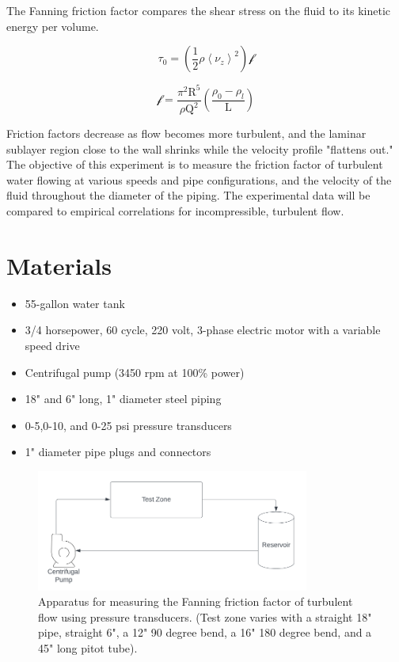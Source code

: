 \documentclass{article}
\begin{document}
\noindent \item \raggedright
The Fanning friction factor compares the shear stress on the fluid to its kinetic energy per volume.

\begin{equation} \label{eq:3} 
\tau_{0} =\left(\frac{1}{2} \rho\left< \nu_{z}\right>^2 \right)\mathcal{f} 
\end{equation}

\linebreak
\linebreak

\begin{equation} \label{eq:4} 
\mathcal{f} = \frac{\pi^2\mathrm{R}^5}{\rho\mathrm{Q}^2} \left( \frac{ \rho_{0} - \rho_{l}}{\mathrm{L}} \right)
\end{equation}

Friction factors decrease as flow becomes more turbulent, and the laminar sublayer region close to the wall shrinks while the velocity profile "flattens out." The objective of this experiment is to measure the friction factor of turbulent water flowing at various speeds and pipe configurations, and the velocity of the fluid throughout the diameter of the piping. The experimental data will be compared to empirical correlations for incompressible, turbulent flow.

\section*{Materials}
\begin{itemize}
    \item 55-gallon water tank
    \item 3/4 horsepower, 60 cycle, 220 volt, 3-phase electric motor with a variable speed drive
    \item Centrifugal pump (3450 rpm at 100\% power)
    \item 18" and 6" long, 1" diameter steel piping
    \item 0-5,0-10, and 0-25 psi pressure transducers
    \item 1" diameter pipe plugs and connectors
\end{itemize}

\begin{figure}[H]
\centering
\includegraphics[width=0.8\textwidth]{images/Capture.PNG}
\caption{\label{fig1}Apparatus for measuring the Fanning friction factor of turbulent flow using pressure transducers. (Test zone varies with a straight 18" pipe, straight 6", a 12" 90 degree bend, a 16" 180 degree bend, and a 45" long pitot tube).}
\end{figure}
\end{document}
